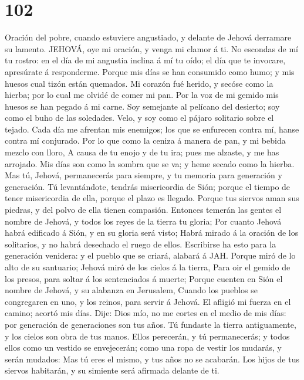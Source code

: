 \hypertarget{section-101}{%
\section{102}\label{section-101}}

 Oración del pobre, cuando estuviere angustiado, y delante
de Jehová derramare su lamento. JEHOVÁ, oye mi oración, y venga mi
clamor á ti.  No escondas de mí tu rostro: en el día de mi
angustia inclina á mí tu oído; el día que te invocare, apresúrate á
responderme.  Porque mis días se han consumido como humo; y
mis huesos cual tizón están quemados.  Mi corazón fué
herido, y secóse como la hierba; por lo cual me olvidé de comer mi pan.
 Por la voz de mi gemido mis huesos se han pegado á mi
carne.  Soy semejante al pelícano del desierto; soy como el
buho de las soledades.  Velo, y soy como el pájaro solitario
sobre el tejado.  Cada día me afrentan mis enemigos; los que
se enfurecen contra mí, hanse contra mí conjurado.  Por lo
que como la ceniza á manera de pan, y mi bebida mezclo con lloro,
 A causa de tu enojo y de tu ira; pues me alzaste, y me has
arrojado.  Mis días son como la sombra que se va; y heme
secado como la hierba.  Mas tú, Jehová, permanecerás para
siempre, y tu memoria para generación y generación.  Tú
levantándote, tendrás misericordia de Sión; porque el tiempo de tener
misericordia de ella, porque el plazo es llegado.  Porque
tus siervos aman sus piedras, y del polvo de ella tienen compasión.
 Entonces temerán las gentes el nombre de Jehová, y todos
los reyes de la tierra tu gloria;  Por cuanto Jehová habrá
edificado á Sión, y en su gloria será visto;  Habrá mirado
á la oración de los solitarios, y no habrá desechado el ruego de ellos.
 Escribirse ha esto para la generación venidera: y el
pueblo que se criará, alabará á JAH.  Porque miró de lo
alto de su santuario; Jehová miró de los cielos á la tierra,
 Para oir el gemido de los presos, para soltar á los
sentenciados á muerte;  Porque cuenten en Sión el nombre de
Jehová, y su alabanza en Jerusalem,  Cuando los pueblos se
congregaren en uno, y los reinos, para servir á Jehová.  El
afligió mi fuerza en el camino; acortó mis días.  Dije:
Dios mío, no me cortes en el medio de mis días: por generación de
generaciones son tus años.  Tú fundaste la tierra
antiguamente, y los cielos son obra de tus manos.  Ellos
perecerán, y tú permanecerás; y todos ellos como un vestido se
envejecerán; como una ropa de vestir los mudarás, y serán mudados:
 Mas tú eres el mismo, y tus años no se acabarán.
 Los hijos de tus siervos habitarán, y su simiente será
afirmada delante de ti.

